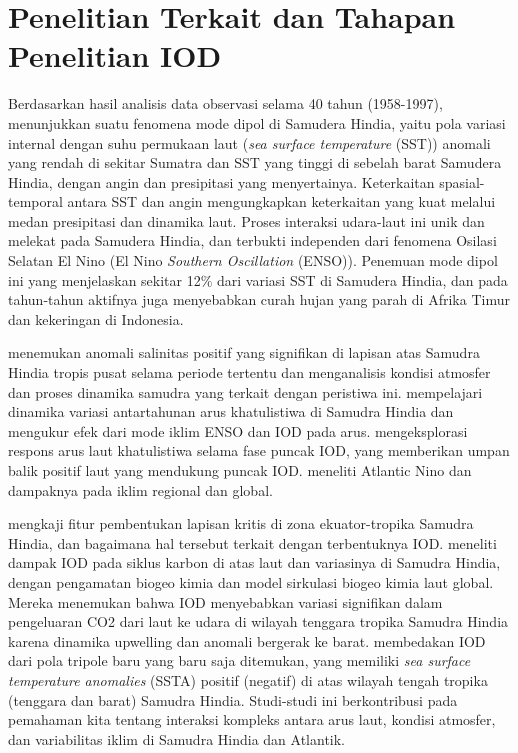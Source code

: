 \vspace{1.5pc}
\vspace{-1pc}
\section[Penelitian Terkait dan Tahapan Penelitian IOD]{Penelitian Terkait dan Tahapan Penelitian IOD}
\begin{spacing}{1.5}
	Berdasarkan hasil analisis data observasi selama 40 tahun (1958-1997),  menunjukkan suatu fenomena mode dipol di Samudera Hindia, yaitu pola variasi internal dengan suhu permukaan laut (\textit{sea surface temperature} (SST)) anomali yang rendah di sekitar Sumatra dan SST yang tinggi di sebelah barat Samudera Hindia, dengan angin dan presipitasi yang menyertainya. Keterkaitan spasial-temporal antara SST dan angin mengungkapkan keterkaitan yang kuat melalui medan presipitasi dan dinamika laut. Proses interaksi udara-laut ini unik dan melekat pada Samudera Hindia, dan terbukti independen dari fenomena Osilasi Selatan El Nino (El Nino \textit{Southern Oscillation} (ENSO)). Penemuan mode dipol ini yang menjelaskan sekitar 12\% dari variasi SST di Samudera Hindia, dan pada tahun-tahun aktifnya juga menyebabkan curah hujan yang parah di Afrika Timur dan kekeringan di Indonesia. 
	
	 menemukan anomali salinitas positif yang signifikan di lapisan atas Samudra Hindia tropis pusat selama periode tertentu dan menganalisis kondisi atmosfer dan proses dinamika samudra yang terkait dengan peristiwa ini.  mempelajari dinamika variasi antartahunan arus khatulistiwa di Samudra Hindia dan mengukur efek dari mode iklim ENSO dan IOD pada arus.  mengeksplorasi respons arus laut khatulistiwa selama fase puncak IOD, yang memberikan umpan balik positif laut yang mendukung puncak IOD.  meneliti Atlantic Nino dan dampaknya pada iklim regional dan global. 
	
	 mengkaji fitur pembentukan lapisan kritis di zona ekuator-tropika Samudra Hindia, dan bagaimana hal tersebut terkait dengan terbentuknya IOD.  meneliti dampak IOD pada siklus karbon di atas laut dan variasinya di Samudra Hindia, dengan pengamatan biogeo kimia dan model sirkulasi biogeo kimia laut global. Mereka menemukan bahwa IOD menyebabkan variasi signifikan dalam pengeluaran CO2 dari laut ke udara di wilayah tenggara tropika Samudra Hindia karena dinamika upwelling dan anomali bergerak ke barat.  membedakan IOD dari pola tripole baru yang baru saja ditemukan, yang memiliki \textit{sea surface temperature anomalies} (SSTA) positif (negatif) di atas wilayah tengah tropika (tenggara dan barat) Samudra Hindia. Studi-studi ini berkontribusi pada pemahaman kita tentang interaksi kompleks antara arus laut, kondisi atmosfer, dan variabilitas iklim di Samudra Hindia dan Atlantik.
	

\end{spacing}
